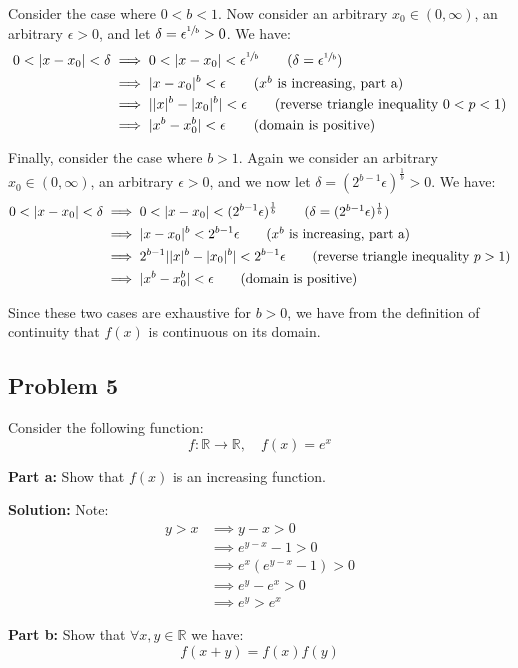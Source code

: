 \documentclass{article}
\newcommand{\R}{\mathbb R}
\begin{document}
Consider the case where $0<b<1$. Now consider an arbitrary $x_0\in(0,\infty)$, an arbitrary $\epsilon>0$, and let $\delta=\epsilon^{\sfrac{1}{b}}>0$. We have:
\begin{align*}
  0<|x-x_0|<\delta&\implies0<|x-x_0|<\epsilon^{\sfrac{1}{b}}\tag{$\delta=\epsilon^{\sfrac{1}{b}}$}\\
  &\implies |x-x_0|^b<\epsilon\tag{$x^b$ is increasing, part a}\\
  &\implies||x|^b-|x_0|^b|<\epsilon\tag{reverse triangle inequality $0<p<1$}\\
  &\implies|x^b-x_0^b|<\epsilon\tag{domain is positive}
\end{align*}

Finally, consider the case where $b>1$. Again we consider an arbitrary $x_0\in(0,\infty)$, an arbitrary $\epsilon>0$, and we now let $\delta=(2^{b-1}\epsilon)^{\frac{1}{b}}>0$. We have:
\begin{align*}
  0<|x-x_0|<\delta&\implies0<|x-x_0|<(2^{b-1}\epsilon)^{\frac{1}{b}}\tag{$\delta=(2^{b-1}\epsilon)^{\frac{1}{b}}$}\\
  &\implies |x-x_0|^b<2^{b-1}\epsilon\tag{$x^b$ is increasing, part a}\\
  &\implies2^{b-1}||x|^b-|x_0|^b|<2^{b-1}\epsilon\tag{reverse triangle inequality $p>1$}\\
  &\implies|x^b-x_0^b|<\epsilon\tag{domain is positive}
\end{align*}

Since these two cases are exhaustive for $b>0$, we have from the definition of continuity that $f(x)$ is continuous on its domain.

\subsection*{Problem 5}
Consider the following function:
$$f:\R\to\R,\quad f(x)=e^x$$

\noindent\textbf{Part a:} Show that $f(x)$ is an increasing function.
\bigskip

\noindent\textbf{Solution:} Note:
\begin{align*}
  y>x&\implies y-x>0\\
  &\implies e^{y-x}-1>0\\
  &\implies e^x(e^{y-x}-1)>0\\
  &\implies e^y-e^x>0\\
  &\implies e^y>e^x
\end{align*}
\bigskip

\noindent\textbf{Part b:} Show that $\forall x,y\in\R$ we have:
$$f(x+y)=f(x)f(y)$$
\end{document}
